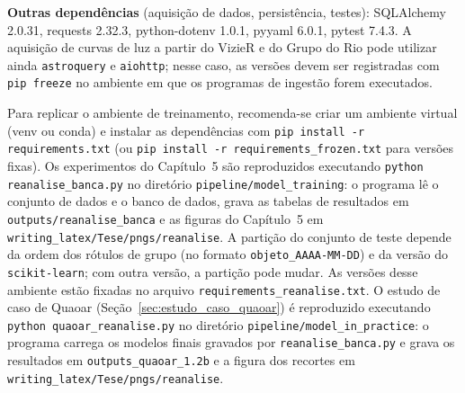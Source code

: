 \textbf{Outras dependências} (aquisição de dados, persistência, testes): SQLAlchemy 2.0.31, requests 2.32.3, python-dotenv 1.0.1, pyyaml 6.0.1, pytest 7.4.3. A aquisição de curvas de luz a partir do VizieR e do Grupo do Rio pode utilizar ainda \texttt{astroquery} e \texttt{aiohttp}; nesse caso, as versões devem ser registradas com \texttt{pip freeze} no ambiente em que os programas de ingestão forem executados.

Para replicar o ambiente de treinamento, recomenda-se criar um ambiente virtual (venv ou conda) e instalar as dependências com \texttt{pip install -r requirements.txt} (ou \texttt{pip install -r requirements\_frozen.txt} para versões fixas). Os experimentos do Capítulo~5 são reproduzidos executando \texttt{python reanalise\_banca.py} no diretório \texttt{pipeline/model\_training}: o programa lê o conjunto de dados e o banco de dados, grava as tabelas de resultados em \texttt{outputs/reanalise\_banca} e as figuras do Capítulo~5 em \texttt{writing\_latex/Tese/pngs/reanalise}. A partição do conjunto de teste depende da ordem dos rótulos de grupo (no formato \texttt{objeto\_AAAA-MM-DD}) e da versão do \texttt{scikit-learn}; com outra versão, a partição pode mudar. As versões desse ambiente estão fixadas no arquivo \texttt{requirements\_reanalise.txt}. O estudo de caso de Quaoar (Seção~\ref{sec:estudo_caso_quaoar}) é reproduzido executando \texttt{python quaoar\_reanalise.py} no diretório \texttt{pipeline/model\_in\_practice}: o programa carrega os modelos finais gravados por \texttt{reanalise\_banca.py} e grava os resultados em \texttt{outputs\_quaoar\_1.2b} e a figura dos recortes em \texttt{writing\_latex/Tese/pngs/reanalise}.
